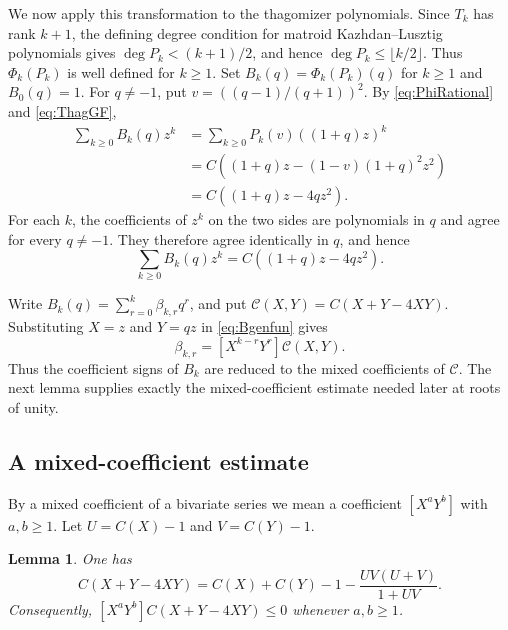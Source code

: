 \documentclass[11pt]{article}
\theoremstyle{plain}
\newtheorem{lemma}[theorem]{Lemma}
\theoremstyle{remark}
\begin{document}
We now apply this transformation to the thagomizer polynomials.  Since
$T_k$ has rank $k+1$, the defining degree condition for matroid
Kazhdan--Lusztig polynomials gives
$\deg P_k<(k+1)/2$, and hence $\deg P_k\le\lfloor k/2\rfloor$.
Thus $\Phi_k(P_k)$ is well defined for $k\ge1$.  Set
$B_k(q)=\Phi_k(P_k)(q)$ for $k\ge1$ and $B_0(q)=1$.  For $q\ne-1$,
put $v=((q-1)/(q+1))^2$.  By \eqref{eq:PhiRational} and
\eqref{eq:ThagGF},
\begin{align*}
\sum_{k\ge0}B_k(q)z^k
&=\sum_{k\ge0}P_k(v)((1+q)z)^k\\
&=C\!\left((1+q)z-(1-v)(1+q)^2z^2\right)\\
&=C((1+q)z-4qz^2).
\end{align*}
For each $k$, the coefficients of $z^k$ on the two sides are
polynomials in $q$ and agree for every $q\ne-1$.  They therefore agree
identically in $q$, and hence
\begin{equation}\label{eq:Bgenfun}
\sum_{k\ge0}B_k(q)z^k=C((1+q)z-4qz^2).
\end{equation}

Write $B_k(q)=\sum_{r=0}^k\beta_{k,r}q^r$, and put
$\mathcal C(X,Y)=C(X+Y-4XY)$.  Substituting $X=z$ and $Y=qz$ in
\eqref{eq:Bgenfun} gives
\begin{equation}\label{eq:betaMixedCoeff}
\beta_{k,r}=[X^{k-r}Y^r]\mathcal C(X,Y).
\end{equation}
Thus the coefficient signs of $B_k$ are reduced to the mixed
coefficients of $\mathcal C$.  The next lemma supplies exactly the
mixed-coefficient estimate needed later at roots of unity.

\subsection{A mixed-coefficient estimate}

By a mixed coefficient of a bivariate series we mean a coefficient
$[X^aY^b]$ with $a,b\ge1$.  Let $U=C(X)-1$ and $V=C(Y)-1$.

\begin{lemma}\label{lem:twoVariableCatalan}
One has
\begin{equation}\label{eq:CXYdecomp}
C(X+Y-4XY)
=C(X)+C(Y)-1-\frac{UV(U+V)}{1+UV}.
\end{equation}
Consequently, $[X^aY^b]C(X+Y-4XY)\le0$ whenever $a,b\ge1$.
\end{lemma}
\end{document}
